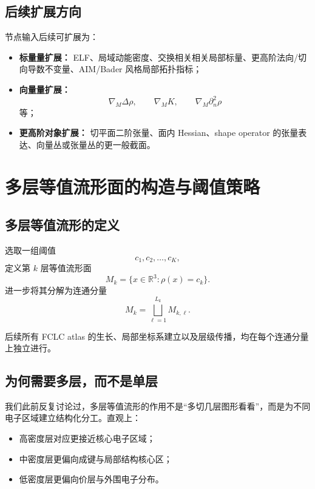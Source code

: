 \documentclass[12pt,a4paper]{ctexart}
\begin{document}
\subsection{后续扩展方向}

节点输入后续可扩展为：
\begin{itemize}[leftmargin=2em]
    \item \textbf{标量量扩展：} ELF、局域动能密度、交换相关相关局部标量、更高阶法向/切向导数不变量、AIM/Bader 风格局部拓扑指标；
    \item \textbf{向量量扩展：}
    \[
    \nabla_M \Delta\rho,\qquad
    \nabla_M K,\qquad
    \nabla_M \partial_n^2\rho
    \]
    等；
    \item \textbf{更高阶对象扩展：} 切平面二阶张量、面内 Hessian、shape operator 的张量表达、向量丛或张量丛的更一般截面。
\end{itemize}

\section{多层等值流形面的构造与阈值策略}

\subsection{多层等值流形的定义}

选取一组阈值
\[
c_1,c_2,\dots,c_K,
\]
定义第 \(k\) 层等值流形面
\[
M_k=\{x\in\mathbb R^3:\rho(x)=c_k\}.
\]
进一步将其分解为连通分量
\[
M_k=\bigsqcup_{\ell=1}^{L_k}M_{k,\ell}.
\]

后续所有 FCLC atlas 的生长、局部坐标系建立以及层级传播，均在每个连通分量上独立进行。

\subsection{为何需要多层，而不是单层}

我们此前反复讨论过，多层等值流形的作用不是“多切几层图形看看”，而是为不同电子区域建立结构化分工。直观上：

\begin{itemize}[leftmargin=2em]
    \item 高密度层对应更接近核心电子区域；
    \item 中密度层更偏向成键与局部结构核心区；
    \item 低密度层更偏向价层与外围电子分布。
\end{itemize}
\end{document}
